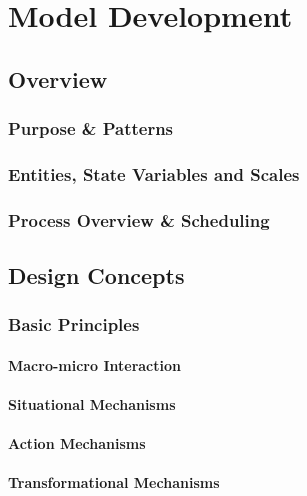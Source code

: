 \chapter{Model Development}

\section{Overview}

\subsection{Purpose \& Patterns}

\subsection{Entities, State Variables and Scales}

\subsection{Process Overview \& Scheduling}

\section{Design Concepts}

\subsection{Basic Principles}
\subsubsection{Macro-micro Interaction}
\subsubsection{Situational Mechanisms}
\subsubsection{Action Mechanisms}
\subsubsection{Transformational Mechanisms}
